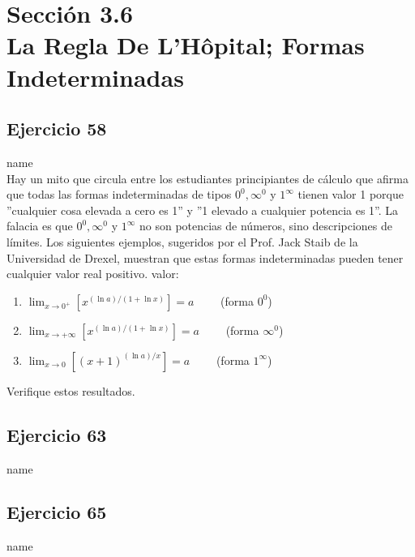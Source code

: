 \documentclass[12pt]{article}
\begin{document}
\section{Sección 3.6 \\ La Regla De L'Hôpital; Formas Indeterminadas} 
\subsection{Ejercicio 58} name \\

Hay un mito que circula entre los estudiantes principiantes de cálculo que afirma que todas las formas indeterminadas de tipos $0^0,\infty^0$ y $1^{\infty}$ tienen valor 1 porque ''cualquier cosa elevada a cero es 1'' y ''1 elevado a cualquier potencia es 1''. La falacia es que $0^0,\infty^0$ y $1^{\infty}$ no son potencias de números, sino descripciones de límites. Los siguientes ejemplos, sugeridos por el Prof. Jack Staib de la Universidad de Drexel, muestran que estas formas indeterminadas pueden tener cualquier valor real positivo.
valor:
\begin{enumerate}[label=(\alph*)]
\item $\lim_{x \to 0^+} [x^{(\ln a)/(1+\ln x)}]=a \qquad$ (forma $0^0$)
\item $\lim_{x \to +\infty} [x^{(\ln a)/(1+\ln x)}]=a \qquad$ (forma $\infty^0$)
\item $\lim_{x \to 0} [(x+1)^{(\ln a)/x}]=a \qquad$ (forma $1^{\infty}$)
\end{enumerate}
Verifique estos resultados.

\subsection{Ejercicio 63} name \\
\subsection{Ejercicio 65} name \\
\end{document}
